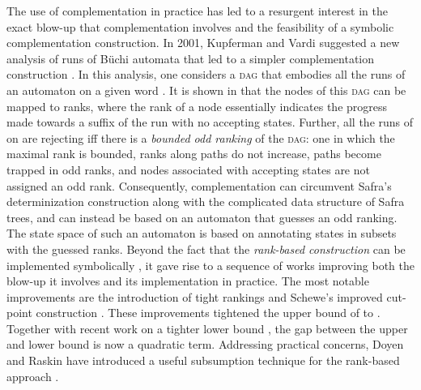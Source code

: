 \documentclass{LMCS}
\newcommand\buchi{B\"uchi\xspace}
\newcommand{\DAG}{\textsc{dag}\xspace}
\begin{document}
The use of complementation in practice has led to a resurgent interest in the exact blow-up that
complementation involves and the feasibility of a symbolic complementation construction.  In 2001,
Kupferman and Vardi suggested a new analysis of runs of \buchi automata that led to a simpler
complementation construction \cite{KV01c}. In this analysis, one considers a \DAG that
embodies all the runs of an automaton  on a given word . It is shown in \cite{KV01c} that the
nodes of this \DAG can be mapped to ranks, where the rank of a node essentially indicates the
progress made towards a suffix of the run with no accepting states.
Further, all the runs of  on  are rejecting iff there is a {\em bounded odd ranking\/} of the
\DAG: one in which the maximal rank is bounded, ranks along paths do not increase, paths become
trapped in odd ranks, and nodes associated with accepting states are not assigned an odd rank.
Consequently, complementation can circumvent Safra's determinization construction along with the
complicated data structure of Safra trees, and can instead be based on an automaton that guesses an
odd ranking. The state space of such an automaton is based on annotating states in subsets with 
the guessed ranks. Beyond the fact that the {\em rank-based construction\/} can be implemented
symbolically \cite{TV07}, it gave rise to a sequence of works improving both the blow-up it involves
and its implementation in practice.  The most notable improvements are the introduction of tight
rankings \cite{FKV06} and Schewe's improved cut-point construction \cite{Sch09}. These improvements tightened
the  upper bound of \cite{KV01c} to .
Together with recent work on a tighter lower bound \cite{Yan06}, the gap between the upper and lower
bound is now a quadratic term.  Addressing practical concerns, Doyen and Raskin have introduced a
useful subsumption technique for the rank-based approach \cite{DR09}.
\end{document}
